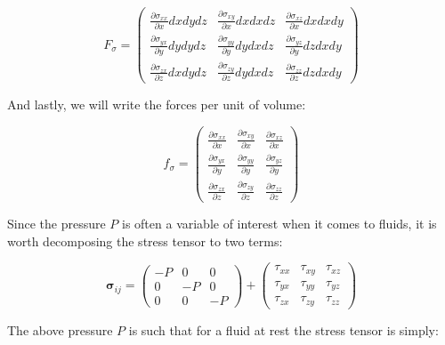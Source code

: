 \begin{equation}
F_{\sigma} = \left(
\begin{matrix} 
\frac{\partial \sigma_{xx}}{\partial x}dx dy dz & \frac{\partial \sigma_{xy}}{\partial x}dx dx dz & \frac{\partial \sigma_{xz}}{\partial x}dx dx dy \\
\frac{\partial \sigma_{yx}}{\partial y}dy dy dz & \frac{\partial \sigma_{yy}}{\partial y}dy dx dz & \frac{\partial \sigma_{yz}}{\partial y}dz dx dy\\
\frac{\partial \sigma_{zx}}{\partial z}dx dy dz & \frac{\partial \sigma_{zy}}{\partial z}dy dx dz & \frac{\partial \sigma_{zz}}{\partial z}dz dx dy
\end{matrix}
\right)
\end{equation}

And lastly, we will write the forces per unit of volume:

\begin{equation} \label{eq:forces_sigma}
f_{\sigma} = \left(
\begin{matrix} 
\frac{\partial \sigma_{xx}}{\partial x} & \frac{\partial \sigma_{xy}}{\partial x} & \frac{\partial \sigma_{xz}}{\partial x} \\
\frac{\partial \sigma_{yx}}{\partial y} & \frac{\partial \sigma_{yy}}{\partial y} & \frac{\partial \sigma_{yz}}{\partial y} \\
\frac{\partial \sigma_{zx}}{\partial z} & \frac{\partial \sigma_{zy}}{\partial z} & \frac{\partial \sigma_{zz}}{\partial z}
\end{matrix}
\right)
\end{equation}

Since the pressure $P$ is often a variable of interest when it comes to fluids, it is worth decomposing the stress tensor to two terms:

\begin{equation}
\bm{\sigma}_{ij} = \left(
\begin{matrix} 
-P & 0 & 0  \\
0 & -P & 0 \\
0 & 0 & -P 
\end{matrix}
\right) + 
\left(
\begin{matrix} 
\tau_{xx} & \tau_{xy} & \tau_{xz} \\
\tau_{yx} & \tau_{yy} & \tau_{yz} \\
\tau_{zx} & \tau_{zy} & \tau_{zz}
\end{matrix}
\right)
\end{equation}

The above pressure $P$ is such that for a fluid at rest the stress tensor is simply:

